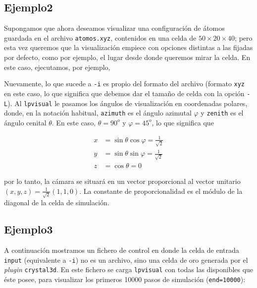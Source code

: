 \subsection{Ejemplo2}

Supongamos que ahora deseamos visualizar una configuraci\'on de \'atomos guardada en el archivo \verb+atomos.xyz+, contenidos en una celda de $50\times20\times40$; pero esta vez queremos que la visualizaci\'on empiece con opciones distintas a las fijadas por defecto, como por ejemplo, el lugar desde donde queremos mirar la celda. En este caso, ejecutamos, por ejemplo,


Nuevamente, lo que sucede a \verb+-i+ es propio del formato del archivo (formato \verb+xyz+ en este caso, lo que significa que debemos dar el tama\~no de celda con la opci\'on \verb+-L+). Al \verb+lpvisual+ le pasamos los \'angulos de visualizaci\'on en coordenadas polares, donde, en la notaci\'on habitual, \verb+azimuth+ es el \'angulo azimutal $\varphi$ y \verb+zenith+ es el \'angulo cenital $\theta$. En este caso, $\theta=90^o$ y $\varphi=45^o$, lo que significa que

\begin{align}
x&=\sin\theta\cos\varphi=\frac1{\sqrt2}\\
y&=\sin\theta\sin\varphi=\frac1{\sqrt2}\\
z&=\cos\theta=0
\end{align}

por lo tanto, la c\'amara se situar\'a en un vector proporcional al vector unitario $(x,y,z)=\frac{1}{\sqrt2}(1,1,0)$. La constante de proporcionalidad es el m\'odulo de la diagonal de la celda de simulaci\'on.


\subsection{Ejemplo3}

A continuaci\'on mostramos un fichero de control en donde la celda de entrada \verb+input+ (equivalente a \verb+-i+) no es un archivo, sino una celda de oro generada por el \emph{plugin} \verb+crystal3d+. En este fichero se carga \verb+lpvisual+ con todas las disponibles que \'este posee, para visualizar los primeros 10000 pasos de simulaci\'on (\verb+end=10000+):

